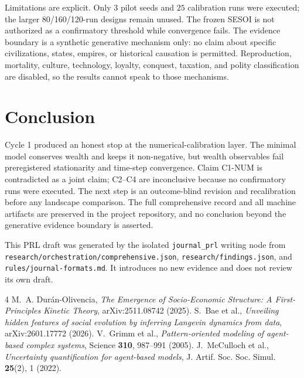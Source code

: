 \documentclass[aps,prl,reprint,superscriptaddress,amsmath,amssymb]{revtex4-2}
\begin{document}
Limitations are explicit. Only $3$ pilot seeds and $25$ calibration runs were executed; the larger 80/160/120-run designs remain unused. The frozen SESOI is not authorized as a confirmatory threshold while convergence fails. The evidence boundary is a synthetic generative mechanism only: no claim about specific civilizations, states, empires, or historical causation is permitted. Reproduction, mortality, culture, technology, loyalty, conquest, taxation, and polity classification are disabled, so the results cannot speak to those mechanisms.

\section{Conclusion}

Cycle 1 produced an honest stop at the numerical-calibration layer. The minimal model conserves wealth and keeps it non-negative, but wealth observables fail preregistered stationarity and time-step convergence. Claim C1-NUM is contradicted as a joint claim; C2--C4 are inconclusive because no confirmatory runs were executed. The next step is an outcome-blind revision and recalibration before any landscape comparison. The full comprehensive record and all machine artifacts are preserved in the project repository, and no conclusion beyond the generative evidence boundary is asserted.

\begin{acknowledgments}
This PRL draft was generated by the isolated \texttt{journal\_prl} writing node from \texttt{research/orchestration/comprehensive.json}, \texttt{research/findings.json}, and \texttt{rules/journal-formats.md}. It introduces no new evidence and does not review its own draft.
\end{acknowledgments}

\begin{thebibliography}{4}
 M.~A. Dur\'an-Olivencia, \emph{The Emergence of Socio-Economic Structure: A First-Principles Kinetic Theory}, arXiv:2511.08742 (2025).
 S.~Bae et al., \emph{Unveiling hidden features of social evolution by inferring Langevin dynamics from data}, arXiv:2601.17772 (2026).
 V.~Grimm et al., \emph{Pattern-oriented modeling of agent-based complex systems}, Science \textbf{310}, 987--991 (2005).
 J.~McCulloch et al., \emph{Uncertainty quantification for agent-based models}, J. Artif. Soc. Soc. Simul. \textbf{25}(2), 1 (2022).
\end{thebibliography}
\end{document}
